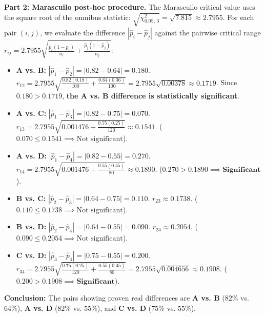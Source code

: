 \begin{solproblema}
	\textbf{Part 2: Marascuilo post-hoc procedure.}
	The Marascuilo critical value uses the square root of the omnibus statistic: $\sqrt{\chi^2_{0.05, \, 3}} = \sqrt{7.815} \approx 2.7955$.
	For each pair $(i, j)$, we evaluate the difference $|\hat{p}_i - \hat{p}_j|$ against the pairwise critical range $r_{ij} = 2.7955 \sqrt{\frac{\hat{p}_i(1-\hat{p}_i)}{n_i} + \frac{\hat{p}_j(1-\hat{p}_j)}{n_j}}$:
	\begin{itemize}
		\item \textbf{A vs. B:} $|\hat{p}_1 - \hat{p}_2| = |0.82 - 0.64| = 0.180$.
		$r_{12} = 2.7955 \sqrt{\frac{0.82(0.18)}{100} + \frac{0.64(0.36)}{100}} = 2.7955 \sqrt{0.00378} \approx 0.1719$.
		Since $0.180 > 0.1719$, \textbf{the A vs. B difference is statistically significant}.
		\item \textbf{A vs. C:} $|\hat{p}_1 - \hat{p}_3| = |0.82 - 0.75| = 0.070$.
		$r_{13} = 2.7955 \sqrt{0.001476 + \frac{0.75(0.25)}{120}} \approx 0.1541$. ($0.070 \le 0.1541 \implies \text{Not significant}$).
		\item \textbf{A vs. D:} $|\hat{p}_1 - \hat{p}_4| = |0.82 - 0.55| = 0.270$.
		$r_{14} = 2.7955 \sqrt{0.001476 + \frac{0.55(0.45)}{80}} \approx 0.1890$. ($0.270 > 0.1890 \implies \textbf{Significant}$).
		\item \textbf{B vs. C:} $|\hat{p}_2 - \hat{p}_3| = |0.64 - 0.75| = 0.110$.
		$r_{23} \approx 0.1738$. ($0.110 \le 0.1738 \implies \text{Not significant}$).
		\item \textbf{B vs. D:} $|\hat{p}_2 - \hat{p}_4| = |0.64 - 0.55| = 0.090$.
		$r_{24} \approx 0.2054$. ($0.090 \le 0.2054 \implies \text{Not significant}$).
		\item \textbf{C vs. D:} $|\hat{p}_3 - \hat{p}_4| = |0.75 - 0.55| = 0.200$.
		$r_{34} = 2.7955 \sqrt{\frac{0.75(0.25)}{120} + \frac{0.55(0.45)}{80}} = 2.7955 \sqrt{0.004656} \approx 0.1908$. ($0.200 > 0.1908 \implies \textbf{Significant}$).
	\end{itemize}
	\textbf{Conclusion:} The pairs showing proven real differences are \textbf{A vs. B} ($82\%$ vs. $64\%$), \textbf{A vs. D} ($82\%$ vs. $55\%$), and \textbf{C vs. D} ($75\%$ vs. $55\%$).
\end{solproblema}

